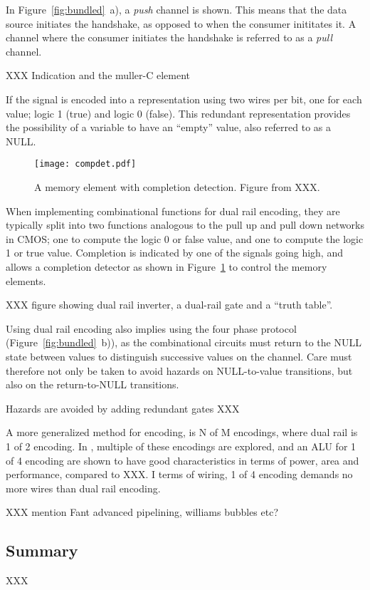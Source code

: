 In Figure~\ref{fig:bundled}~a), a \emph{push} channel is shown. This means
that the data source initiates the handshake, as opposed to when the
consumer inititates it. A channel where the consumer initiates the
handshake is referred to as a \emph{pull} channel.

XXX Indication and the muller-C element

If the signal is encoded into a representation using two wires per
bit, one for each value; logic 1 (true) and logic 0 (false). This
redundant representation provides the possibility of a variable to
have an ``empty'' value, also referred to as a NULL. 

\begin{figure}[htbp]
  \centering
  \texttt{[image: compdet.pdf]}
  \caption{A memory element with completion detection. Figure from XXX.}
  \label{fig:compdet}
\end{figure}

When implementing combinational functions for dual rail encoding, they
are typically split into two functions analogous to the pull up and
pull down networks in CMOS; one to compute the logic 0 or false value,
and one to compute the logic 1 or true value. Completion is indicated
by one of the signals going high, and allows a completion detector as
shown in Figure~\ref{fig:compdet} to control the memory elements.

XXX figure showing dual rail inverter, a dual-rail gate and a ``truth
table''.

Using dual rail encoding also implies using the four phase protocol
(Figure~\ref{fig:bundled}~b)), as the combinational circuits must
return to the NULL state between values to distinguish successive
values on the channel. Care must therefore not only be taken to avoid
hazards on NULL-to-value transitions, but also on the return-to-NULL
transitions.

Hazards are avoided by adding redundant gates XXX

A more generalized method for encoding, is N of M encodings, where
dual rail is 1 of 2 encoding. In \cite{nullconv}, multiple of these
encodings are explored, and an ALU for 1 of 4 encoding are shown to
have good characteristics in terms of power, area and performance,
compared to XXX. I terms of wiring, 1 of 4 encoding demands no more
wires than dual rail encoding. 

XXX mention Fant advanced pipelining, williams bubbles etc?

\subsection{Summary}

XXX


